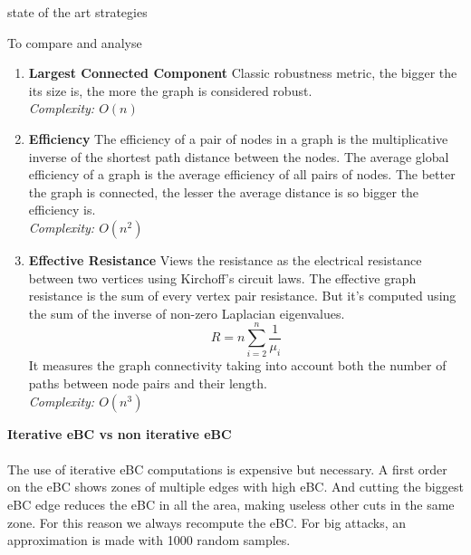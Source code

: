 state of the art strategies

To compare and analyse 
\begin{enumerate}
    \item \textbf{Largest Connected Component}
    Classic robustness metric, the bigger the its size is, the more the graph is considered robust.\\
    \textit{Complexity: $O(n)$}

    \item \textbf{Efficiency}
    The efficiency of a pair of nodes in a graph is the multiplicative inverse of the shortest path distance between the nodes. The average global efficiency of a graph is the average efficiency of all pairs of nodes. The better the graph is connected, the lesser the average distance is so bigger the efficiency is.\\
    \textit{Complexity: $O(n^2)$}

    \item \textbf{Effective Resistance}
    Views the resistance as the electrical resistance between two vertices using Kirchoff's circuit laws. The effective graph resistance is the sum of every vertex pair resistance. But it's computed using the sum of the inverse of non-zero Laplacian eigenvalues.
    $$R = n \sum_{i=2}^n\frac{1}{\mu_i}$$
    It measures the graph connectivity taking into account both the number of paths between node pairs and their length.\\
    \textit{Complexity: $O(n^3)$}
\end{enumerate}


    \textbf{Iterative eBC vs non iterative eBC}\\
    \vspace{1pt}\\
    The use of iterative eBC computations is expensive but necessary. A first order on the eBC shows zones of multiple edges with high eBC. And cutting the biggest eBC edge reduces the eBC in all the area, making useless other cuts in the same zone. For this reason we always recompute the eBC. For big attacks, an approximation is made with 1000 random samples.\\